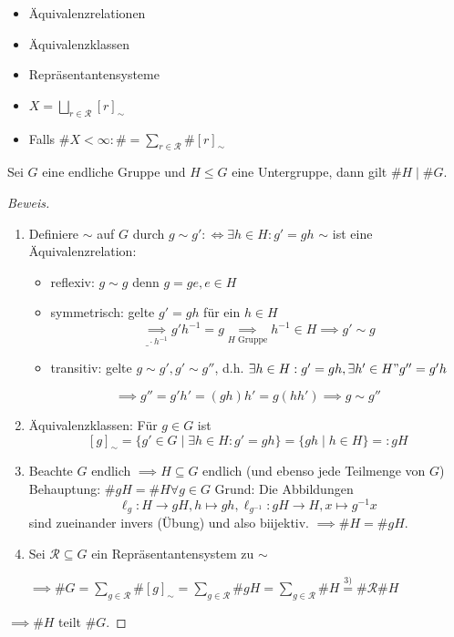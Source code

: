 \documentclass[a4paper]{report}
\begin{document}
\begin{whg*}[Vorbereitung]
  \item
\begin{itemize}
\item Äquivalenzrelationen
\item Äquivalenzklassen
\item Repräsentantensysteme
\end{itemize}
\end{whg*}

\begin{bem*} \item
  \begin{itemize}
        \item $X = \bigsqcup_{r \in \mathcal R} [r]_{\sim}$
        \item Falls $\#X < \infty : \# = \sum_{r \in \mathcal R} \# [r]_{\sim}$ %
  \end{itemize}
\end{bem*}

\begin{satz}
Sei $G$ eine endliche Gruppe und $H \le G$ eine Untergruppe, dann gilt $\#H \mid \#G$.
\end{satz}
\begin{proof}[Beweis] \item
  \begin{enumerate} [1)]
    \item Definiere $\sim$ auf $G$ durch $g \sim g' :\iff \exists h \in H : g' = gh$
          $\sim$ ist eine Äquivalenzrelation:
          \begin{itemize}
            \item reflexiv: $g \sim g$ denn $g = ge, e \in H$
            \item symmetrisch: gelte $g' = gh$ für ein $h \in H$ $$\underset{\_\cdot h^{-1}}{\implies} g'h^{-1}=g \underset{H \text{ Gruppe}} \implies h^{-1} \in H \implies g' \sim g$$
            \item transitiv: gelte $g \sim g', g' \sim g''$, d.h. $\exists h \in H : g' = gh, \exists h' \in H " g'' = g'h$
          \end{itemize}
            $$\implies g'' = g'h' = (gh)h' = g(hh') \implies g \sim g''$$
    \item Äquivalenzklassen: Für $g \in G$ ist
    $$[g]_{\sim} = \{g' \in G \mid \exists h \in H : g' = gh\} = \{gh \mid h \in H\} =: gH$$
    \item Beachte $G$ endlich $\implies H \subseteq G$ endlich (und ebenso jede Teilmenge von $G$)
        Behauptung: $\#gH = \#H \forall g \in G$
        Grund: Die Abbildungen $$\ell_{g}: H \to gH, h \mapsto gh, \ell_{g^{-1}}: gH \to H, x \mapsto g^{-1}x$$ sind zueinander invers (Übung) und also biijektiv. $\implies \#H = \#gH$.
    \item Sei $\mathcal R \subseteq G$ ein Repräsentantensystem zu $\sim$

          $\implies \#G = \sum_{g \in \mathcal R} \# [g]_{\sim} = \sum_{g \in \mathcal R} \#gH = \sum_{g \in \mathcal R} \#H \overset{3)}= \# \mathcal R \# H$
  \end{enumerate}
$\implies \#H$ teilt $\#G$.
\end{proof}
\end{document}

